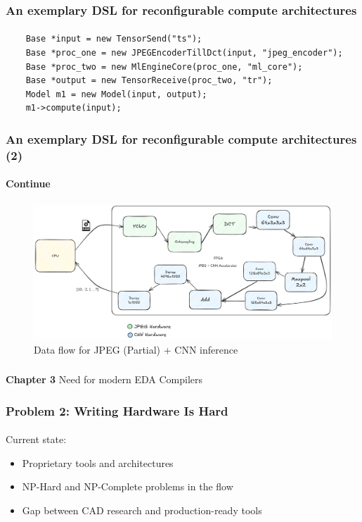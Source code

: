 \documentclass{beamer}
\begin{document}
{\begin{frame}[fragile]
  \frametitle{An exemplary DSL for reconfigurable compute architectures}
\framesubtitle{}
  \begin{lstlisting}
    Base *input = new TensorSend("ts");
    Base *proc_one = new JPEGEncoderTillDct(input, "jpeg_encoder");
    Base *proc_two = new MlEngineCore(proc_one, "ml_core");
    Base *output = new TensorReceive(proc_two, "tr");
    Model m1 = new Model(input, output);
    m1->compute(input);
  \end{lstlisting}
\end{frame}

\begin{frame}[fragile]
  \frametitle{An exemplary DSL for reconfigurable compute architectures (2)}
\framesubtitle{Continue}
   \begin{figure}
        \centering
        \includegraphics[width=1\linewidth]{images/flowcnnjpeg.png}
        \caption{Data flow for JPEG (Partial) + CNN inference}
    \end{figure}
\end{frame}


\begin{frame}[c,fragile]
  \frametitle{}

  \centering
  \textbf{Chapter 3} 
  \centering
  Need for modern EDA Compilers
\end{frame}

\newcommand\myheading[1]{%
  \par\bigskip
  {\Large\bfseries#1}\par\smallskip}

 
\begin{frame}[fragile]
  \frametitle{Problem 2: Writing Hardware Is Hard}
  \framesubtitle{}
Current state:
  \begin{itemize}
\item Proprietary tools and architectures
\item NP-Hard and NP-Complete problems in the flow
\item Gap between CAD research and production-ready tools
  \end{itemize}
\end{frame}

}
\end{document}
